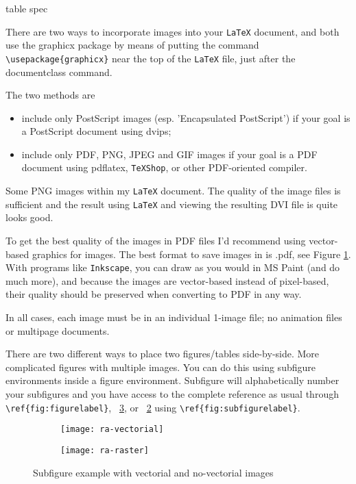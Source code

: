 \begin{tabular}[pos]{table spec}
\begin{sloppypar}
There are two ways to incorporate images into your \texttt{LaTeX} document, and both use the graphicx package by means of putting the command  \verb!\usepackage{graphicx}!  near the top of the \texttt{LaTeX} file, just after the documentclass command.
\end{sloppypar}

The two methods are

\begin{itemize}
\item  include only PostScript images (esp. 'Encapsulated PostScript') if your goal is a PostScript document using dvips;
\item include only PDF, PNG, JPEG and GIF images if your goal is a PDF document using pdflatex, \texttt{TeXShop}, or other PDF-oriented compiler. 
\end{itemize}

Some PNG images within my \texttt{LaTeX} document. The quality of the image files is sufficient and the result using \texttt{LaTeX} and viewing the resulting DVI file is quite looks good.

To get the best quality of the images in  PDF files I'd recommend using vector-based graphics for images. The best format to save images in is .pdf, see Figure \ref{fig:ra-vectorial}. With programs like \texttt{Inkscape}, you can draw as you would in MS Paint (and do much more), and because the images are vector-based instead of pixel-based, their quality should be preserved when converting to PDF in any way.    

In all cases, each image must be in an individual 1-image file; no animation files or multipage documents. 

There are two different ways to place two figures/tables side-by-side.  More complicated figures with multiple images. You can do this using subfigure environments inside a figure environment. Subfigure will alphabetically number your subfigures and you have access to the complete reference as usual through \verb!\ref{fig:figurelabel}!, \figurename~\ref{fig:figura-completa}, or \figurename~\ref{fig:ra-raster} using \verb!\ref{fig:subfigurelabel}!.

\begin{figure}[htbp]
	\centering
    \begin{subfigure}{0.4\textwidth}
    	\centering
		\texttt{[image: ra-vectorial]}
		\caption{}
		\label{fig:ra-vectorial}
     \end{subfigure}	
\qquad\qquad
 	\begin{subfigure}{0.4\textwidth}
    	\centering
		\texttt{[image: ra-raster]}
		\caption{}
		\label{fig:ra-raster}
	\end{subfigure}		
  \caption{Subfigure example with vectorial and no-vectorial images}
  \label{fig:figura-completa}
\end{figure}


\end{tabular}
